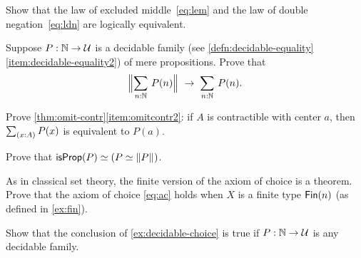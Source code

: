 \documentclass[hott-all.tex]{subfiles}
\begin{document}
\begin{ex}\label{ex:lem-ldn}
  Show that the law of excluded middle~\eqref{eq:lem} and the law of double negation~\eqref{eq:ldn} are logically equivalent.
\end{ex}

\begin{ex}\label{ex:decidable-choice}
  Suppose $P:\mathbb{N}\to\mathcal{U}$ is a decidable family (see \cref{defn:decidable-equality}\ref{item:decidable-equality2}) of mere propositions.
  Prove that
  \[ \Brck{\sm{n:\nat} P(n)} \;\to\; \sm{n:\nat}P(n).\]
\end{ex}

\begin{ex}\label{ex:omit-contr2}
  Prove \cref{thm:omit-contr}\ref{item:omitcontr2}: if $A$ is contractible with center $a$, then $\sm{x:A} P(x)$ is equivalent to $P(a)$.
\end{ex}

\begin{ex}\label{ex:isprop-equiv-equiv-bracket}
  Prove that $\mathsf{isProp}(P) \simeq (P \simeq \mathopen{}\left\Vert P\right\Vert_{}\mathclose{})$.
\end{ex}

\begin{ex}\label{ex:finite-choice}
  As in classical set theory, the finite version of the axiom of choice is a theorem.  Prove that the axiom of choice \eqref{eq:ac} holds when $X$ is a finite type $\mathsf{Fin}(n)$ (as defined in \cref{ex:fin}).
\end{ex}

\begin{ex}\label{ex:decidable-choice-strong}
  Show that the conclusion of \cref{ex:decidable-choice} is true if $P:\mathbb{N}\to\mathcal{U}$ is any decidable family.
\end{ex}
\end{document}
